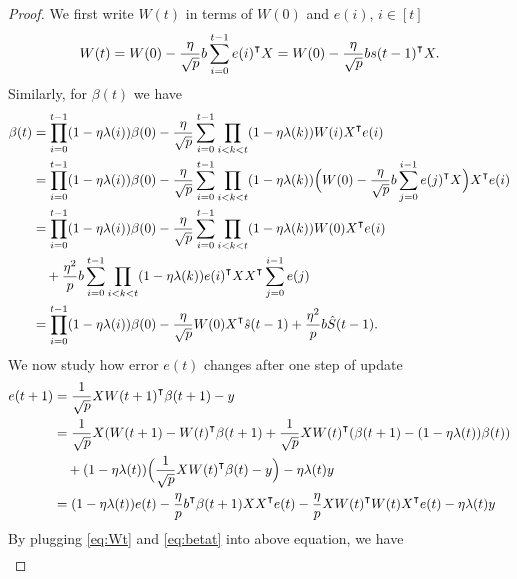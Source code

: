 \begin{proof}
We first write $W(t)$ in terms of $W(0)$ and $e(i)$, $i\in[t]$
\begin{equation}
\label{eq:Wt}
    W(t) = W(0) -\frac{\eta}{\sqrt p} b\sum_{i=0}^{t-1}e(i)\transpose X = W(0) -\frac{\eta}{\sqrt p} bs(t-1)\transpose X.
\end{equation}
Similarly, for $\beta(t)$ we have
\begin{equation}
\label{eq:betat}
\begin{aligned}
    \beta(t) &=\prod_{i=0}^{t-1}(1-\eta\lambda(i))\beta(0)-\frac{\eta}{\sqrt p}\sum_{i=0}^{t-1}\prod_{i<k<t}(1-\eta\lambda(k))W(i)X\transpose e(i) \\
    &=\prod_{i=0}^{t-1}(1-\eta\lambda(i))\beta(0)-\frac{\eta}{\sqrt p}\sum_{i=0}^{t-1}\prod_{i<k<t}(1-\eta\lambda(k))\Big(W(0) -\frac{\eta}{\sqrt p} b\sum_{j=0}^{i-1}e(j)\transpose X\Big)X\transpose e(i) \\
    &=\prod_{i=0}^{t-1}(1-\eta\lambda(i))\beta(0)-\frac{\eta}{\sqrt p}\sum_{i=0}^{t-1}\prod_{i<k<t}(1-\eta\lambda(k))W(0)X\transpose e(i)\\
    &\quad + \frac{\eta^2}{p}b\sum_{i=0}^{t-1}\prod_{i<k<t}(1-\eta\lambda(k))e(i)\transpose XX\transpose \sum_{j=0}^{i-1}e(j) \\
    &=\prod_{i=0}^{t-1}(1-\eta\lambda(i))\beta(0) -\frac{\eta}{\sqrt p}W(0)X\transpose \hat{s}(t-1) +\frac{\eta^2}{p}b \hat{S}(t-1).
\end{aligned}
\end{equation}
We now study how error $e(t)$ changes after one step of update
\begin{equation*}
\begin{aligned}
    e(t+1) &= \frac{1}{\sqrt p}XW(t+1)\transpose \beta(t+1)-y \\
    &= \frac{1}{\sqrt p}X(W(t+1)-W(t)\transpose \beta(t+1)+ \frac{1}{\sqrt p}XW(t)\transpose (\beta(t+1)-(1-\eta\lambda(t))\beta(t)) \\
    &\quad +(1-\eta\lambda(t))\Big(\frac{1}{\sqrt p}XW(t)\transpose \beta(t)-y\Big) -\eta\lambda(t)y\\
    &=(1-\eta\lambda(t))e(t) - \frac{\eta}{p}b\transpose\beta(t+1)XX\transpose e(t)  - \frac{\eta}{p}XW(t)\transpose W(t)X\transpose e(t) - \eta\lambda(t)y
\end{aligned}
\end{equation*}
By plugging \eqref{eq:Wt} and \eqref{eq:betat} into above equation, we have
\begin{equation*}   
\begin{aligned}

\end{aligned}
\end{equation*}
\end{proof}
